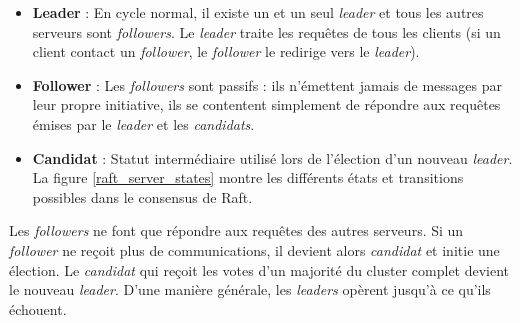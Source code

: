 \begin{itemize}
    \item \textbf{Leader} :
        En cycle normal, il existe un et un seul \emph{leader} et tous les autres
        serveurs sont \emph{followers}. Le \emph{leader} traite les requêtes de
        tous les clients (si un client contact un \emph{follower}, le
        \emph{follower} le redirige vers le \emph{leader}).
    \item \textbf{Follower} :
        Les \emph{followers} sont passifs : ils n'émettent jamais de messages par
        leur propre initiative, ils se contentent simplement de répondre aux
        requêtes émises par le \emph{leader} et les \emph{candidats}.
    \item \textbf{Candidat} :
        Statut intermédiaire utilisé lors de l'élection d'un nouveau
        \emph{leader}. La figure \ref{raft_server_states} montre les différents états
        et transitions possibles dans le consensus de Raft.
\end{itemize}

Les \emph{followers} ne font que répondre aux requêtes des autres serveurs. Si
un \emph{follower} ne reçoit plus de communications, il devient alors
\emph{candidat} et initie une élection. Le \emph{candidat} qui reçoit les votes
d'un majorité du cluster complet devient le nouveau \emph{leader}. D'une manière
générale, les \emph{leaders} opèrent jusqu'à ce qu'ils échouent.


